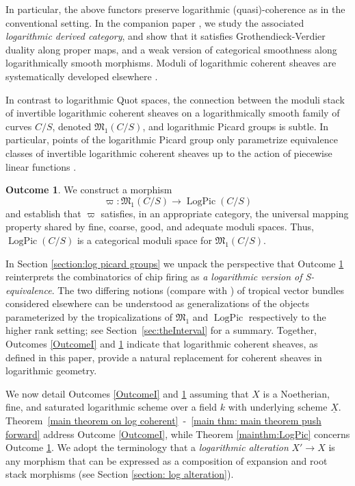 \documentclass[11pt]{amsart}
\theoremstyle{definition}
\theoremstyle{definition}
\newtheorem{outcome}{Outcome}
\begin{document}
In particular, the above functors preserve logarithmic (quasi)-coherence as in the conventional setting. In the companion paper \cite{Logarithmic-derived-category}, we study the associated \textit{logarithmic derived category}, and show that it satisfies Grothendieck-Verdier duality along proper maps, and a weak version of categorical smoothness along logarithmically smooth morphisms. Moduli of logarithmic coherent sheaves are systematically developed elsewhere \cite{Kennedy-Hunt-Poiret-Song:Log-Vector-bundle}.

In contrast to logarithmic Quot spaces, the connection between the moduli stack of invertible logarithmic coherent sheaves on a logarithmically smooth family of curves $C/S$, denoted $\mathfrak{M}_1(C/S)$, and logarithmic Picard groups \cite{MolchoWise} is subtle. In particular, points of the logarithmic Picard group only parametrize equivalence classes of invertible logarithmic coherent sheaves up to the action of piecewise linear functions \cite{ModStckTropCurve,HolmesSchwarz2022,MolchoRanganathan2024}.
\begin{outcome}\label{Outcome:BeholdLogPic}
    We construct a morphism $$\varpi\colon \mathfrak{M}_1(C/S)\longrightarrow \operatorname{LogPic}(C/S)$$ and establish that $\varpi$ satisfies, in an appropriate category, the universal mapping property shared by fine, coarse, good, and adequate moduli spaces. Thus, $\operatorname{LogPic}(C/S)$ is a categorical moduli space for $\mathfrak{M}_1(C/S)$.
\end{outcome}
In Section \ref{section:log picard groups} we unpack the perspective that Outcome \ref{Outcome:BeholdLogPic} reinterprets the combinatorics of chip firing as \textit{a logarithmic version of S-equivalence}. The two differing notions (compare \cite{KavehManonTropVB,KavehManon2025,KhanMaclagan2026} with \cite{GrossKaurWernerTropical,GrossZakharov2022}) of tropical vector bundles considered elsewhere can be understood as generalizations of the objects parameterized by the tropicalizations of $\mathfrak{M}_1$ and $\operatorname{LogPic}$ respectively to the higher rank setting; see Section~\ref{sec:theInterval} for a summary. Together, Outcomes \ref{OutcomeI} and \ref{Outcome:BeholdLogPic} indicate that logarithmic coherent sheaves, as defined in this paper, provide a natural replacement for coherent sheaves in logarithmic geometry.

We now detail Outcomes \ref{OutcomeI} and \ref{Outcome:BeholdLogPic} assuming that $X$ is a Noetherian, fine, and saturated logarithmic scheme over a field $k$ with underlying scheme $\underline{X}$. Theorem~\ref{main theorem on log coherent}~-~\ref{main thm: main theorem push forward} address Outcome \ref{OutcomeI}, while Theorem \ref{mainthm:LogPic} concerns Outcome \ref{Outcome:BeholdLogPic}. We adopt the terminology that a \textit{logarithmic alteration} $X'\rightarrow X$ is any morphism that can be expressed as a composition of expansion and root stack morphisms (see Section \ref{section: log alteration}). 
\end{document}
